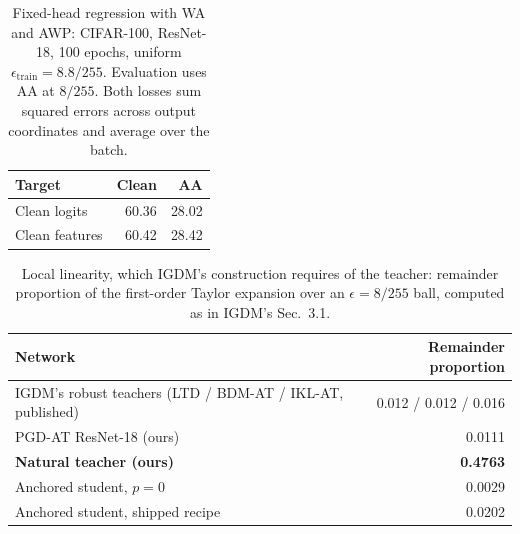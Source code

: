 \documentclass{article} %
\theoremstyle{plain}
\begin{document}
\begin{table}[!htbp]
  \centering \small \setlength{\tabcolsep}{6pt}
  \caption{Fixed-head regression with WA and AWP: CIFAR-100, ResNet-18, 100 epochs,
  uniform $\epsilon_{\mathrm{train}}=8.8/255$. Evaluation uses AA at $8/255$.
  Both losses sum squared errors across output coordinates and average over the batch.}
  \label{tab:regression_stack}
  \begin{tabular}{lrr}
    \toprule
    Target & Clean & AA \\
    \midrule
    Clean logits & 60.36 & 28.02 \\
    Clean features & 60.42 & 28.42 \\
    \bottomrule
  \end{tabular}
\end{table}

\begin{table}[!htbp]
  \centering \small \setlength{\tabcolsep}{4.5pt}
  \caption{Local linearity, which IGDM's construction requires of the teacher: remainder proportion of
  the first-order Taylor expansion over an $\epsilon=8/255$ ball, computed as in IGDM's Sec.~3.1.}
  \label{tab:linearity}
  \begin{tabular}{lr}
    \toprule
    Network & Remainder proportion \\
    \midrule
    IGDM's robust teachers (LTD / BDM-AT / IKL-AT, published) & 0.012 / 0.012 / 0.016 \\
    PGD-AT ResNet-18 (ours)          & 0.0111 \\
    \textbf{Natural teacher (ours)}  & \textbf{0.4763} \\
    Anchored student, $p=0$          & 0.0029 \\
    Anchored student, shipped recipe & 0.0202 \\
    \bottomrule
  \end{tabular}
\end{table}
\end{document}
